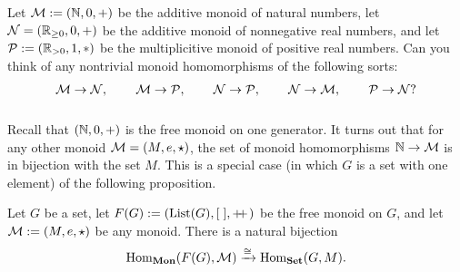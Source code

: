 \begin{exerciseRUS}
\end{exerciseRUS}

\begin{exerciseENG}
Let $\mathcal{M}:=({\mathbb N},0,+)$ be the additive monoid of natural numbers, let $\mathcal{N}=({\mathbb R}_{\geq0},0,+)$ be the additive monoid of nonnegative real numbers, and let $\mathcal{P}:=({\mathbb R}_{>0},1,*)$ be the multiplicitive monoid of positive real numbers. Can you think of any nontrivial monoid homomorphisms of the following sorts: $$\mathcal{M}\rightarrow\mathcal{N},\hspace{.3in}\mathcal{M}\rightarrow\mathcal{P},\hspace{.3in}\mathcal{N}\rightarrow\mathcal{P},\hspace{.3in} \mathcal{N}\rightarrow\mathcal{M},\hspace{.3in}\mathcal{P}\rightarrow\mathcal{N}?$$
\end{exerciseENG}

\begin{exerciseRUS}
\end{exerciseRUS}



\subsubsection{}

\begin{blockENG}
Recall that $({\mathbb N},0,+)$ is the free monoid on one generator. It turns out that for any other monoid $\mathcal{M}=(M,e,\star)$, the set of monoid homomorphisms ${\mathbb N}\rightarrow\mathcal{M}$ is in bijection with the set $M$. This is a special case (in which $G$ is a set with one element) of the following proposition.
\end{blockENG}

\begin{blockRUS}
\end{blockRUS}

\begin{propositionENG}\label{prop:free monoid}
Let $G$ be a set, let $F(G):=(\textnormal{List}(G),[\;],+\!\!+\hspace{1pt})$ be the free monoid on $G$, and let $\mathcal{M}:=(M,e,\star)$ be any monoid. There is a natural bijection
$$\textnormal{Hom}_{\bf Mon}(F(G),\mathcal{M})\xrightarrow{\cong}\textnormal{Hom}_{\bf Set}(G,M).$$
\end{propositionENG}

\begin{propositionRUS}\label{prop:free monoid}
\end{propositionRUS}

